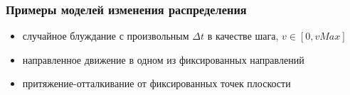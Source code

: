 \documentclass{beamer} %
\theoremstyle{definition} %
\begin{document}
\begin{frame} 
\frametitle{Примеры моделей изменения распределения}
\begin{itemize}
\item{случайное блуждание с произвольным $\Delta t$ в качестве шага, $v \in [0, vMax]$}
\item{направленное движение в одном из фиксированных направлений}
\item{притяжение-отталкивание от фиксированных точек плоскости}
\end{itemize}
\end{frame}

\begin{comment}
\begin{frame}
\frametitle{Проблемa}
\begin{itemize}
  \item{ядро нужно применять раз в $\Delta t$ из физических соображений}
  \item{$\frac{1}{\Delta t} \ll 60FPS$} 
\end{itemize}
\end{frame}

\begin{frame}
\frametitle{Решение проблемы}
\begin{itemize}
  \item{приближенные версии частично примененных ядер $K_{\frac{1}{3}}, K_{\frac{2}{3}}$}
  \item{погрешность не накапливается, так как минимум предыдущий кадр ключевой}
\end{itemize}
\end{frame}
\end{comment}

\begin{comment}
\begin{frame}
  \frametitle{Проблема}
\begin{columns}
\column{.6\textwidth}
\column{.4\textwidth}
\only<.>{изначально выделенной текстуры недостаточно}
\end{columns}
\end{frame}

\begin{frame}
  \frametitle{Решение проблемы}
\begin{columns}
\column{.6\textwidth}
\column{.4\textwidth}
\only<.(-2)->{Начинает выходить?}
\begin{itemize}
  \item<.(-1)->{перецентрировать}
  \item<.(0)->{увеличить x2 (совместить четыре ячейки в одну)}
\end{itemize}
\end{columns}
\end{frame}
\end{comment}
\end{document}
